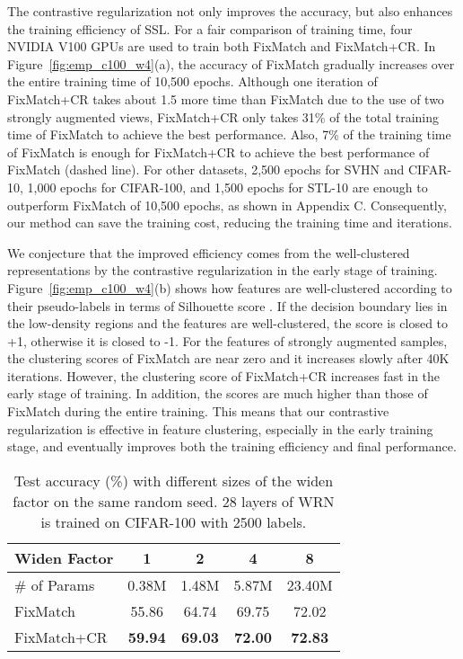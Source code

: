 \documentclass[letterpaper]{article} \usepackage{aaai22}  \usepackage{times}  \usepackage{helvet}  \usepackage{courier}  \usepackage[hyphens]{url}  \usepackage{graphicx} \urlstyle{rm} \def\UrlFont{\rm}  \usepackage{natbib}  \usepackage{caption} \DeclareCaptionStyle{ruled}{labelfont=normalfont,labelsep=colon,strut=off} \frenchspacing  \setlength{\pdfpagewidth}{8.5in}  \setlength{\pdfpageheight}{11in}  \usepackage{algorithm}
\begin{document}
The contrastive regularization not only improves the accuracy, but also enhances the training efficiency of SSL.
For a fair comparison of training time, four NVIDIA V100 GPUs are used to train both FixMatch and FixMatch+CR.
In Figure~\ref{fig:emp_c100_w4}(a), the accuracy of FixMatch gradually increases over the entire training time of 10,500 epochs.
Although one iteration of FixMatch+CR takes about 1.5 more time than FixMatch due to the use of two strongly augmented views, FixMatch+CR only takes 31\% of the total training time of FixMatch to achieve the best performance.
Also, 7\% of the training time of FixMatch is enough for FixMatch+CR to achieve the best performance of FixMatch (dashed line).
For other datasets, 2,500 epochs for SVHN and CIFAR-10, 1,000 epochs for CIFAR-100, and 1,500 epochs for STL-10 are enough to outperform FixMatch of 10,500 epochs, as shown in Appendix C.
Consequently, our method can save the training cost, reducing the training time and iterations.

We conjecture that the improved efficiency comes from the well-clustered representations by the contrastive regularization in the early stage of training.
Figure~\ref{fig:emp_c100_w4}(b) shows how features are well-clustered according to their pseudo-labels in terms of Silhouette score \cite{rousseeuw1987silhouettes}. 
If the decision boundary lies in the low-density regions and the features are well-clustered, the score is closed to +1, otherwise it is closed to -1.
For the features of strongly augmented samples, the clustering scores of FixMatch are near zero and it increases slowly after 40K iterations.
However, the clustering score of FixMatch+CR increases fast in the early stage of training. 
In addition, the scores are much higher than those of FixMatch during the entire training. 
This means that our contrastive regularization is effective in feature clustering, especially in the early training stage, and eventually improves both the training efficiency and final performance. 

\begin{table} \centering
\footnotesize
\caption{Test accuracy (\%) with different sizes of the widen factor on the same random seed. 28 layers of WRN is trained on CIFAR-100 with 2500 labels.}
\label{tab:abl_wf}
\begin{tabular}{l|cccc}
\toprule
 Widen Factor & 1 & 2 & 4 & 8 \\ \hline
 \# of Params & 0.38M & 1.48M & 5.87M & 23.40M \\ \hline
FixMatch & 55.86 & 64.74 & 69.75 & 72.02 \\
FixMatch+CR & \textbf{59.94} & \textbf{69.03} & \textbf{72.00} & \textbf{72.83} \\
\bottomrule
\end{tabular}
\vspace{-0.1in}
\end{table}
\end{document}
